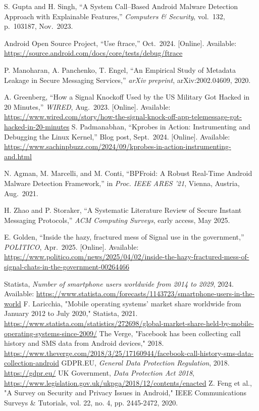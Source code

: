 \documentclass[a4paper,12pt]{report}
\begin{document}
\begin{thebibliography}{99}
S. Gupta and H. Singh, “A System Call–Based Android Malware Detection Approach with Explainable Features,” \emph{Computers \& Security}, vol.\ 132, p.~103187, Nov.\ 2023.

Android Open Source Project, “Use ftrace,” Oct.\ 2024.  [Online]. Available: \url{https://source.android.com/docs/core/tests/debug/ftrace}

P. Manoharan, A. Panchenko, T. Engel,
``An Empirical Study of Metadata Leakage in Secure Messaging Services,''
\emph{arXiv preprint}, arXiv:2002.04609, 2020.

A. Greenberg,
``How a Signal Knockoff Used by the US Military Got Hacked in 20 Minutes,''
\emph{WIRED}, Aug.\ 2023.
[Online]. Available: \url{https://www.wired.com/story/how-the-signal-knock-off-app-telemessage-got-hacked-in-20-minutes}
S. Padmanabhan, “Kprobes in Action: Instrumenting and Debugging the Linux Kernel,” Blog post, Sept.\ 2024.  [Online]. Available: \url{https://www.sachinpbuzz.com/2024/09/kprobes-in-action-instrumenting-and.html}

N. Agman, M. Marcelli, and M. Conti, “BPFroid: A Robust Real-Time Android Malware Detection Framework,” in \emph{Proc. IEEE ARES ’21}, Vienna, Austria, Aug.\ 2021.

H. Zhao and P. Storaker, “A Systematic Literature Review of Secure Instant Messaging Protocols,” \emph{ACM Computing Surveys}, early access, May 2025.

E. Golden, “Inside the hazy, fractured mess of Signal use in the government,” \emph{POLITICO}, Apr.\ 2025.  [Online]. Available: \url{https://www.politico.com/news/2025/04/02/inside-the-hazy-fractured-mess-of-signal-chats-in-the-government-00264466}

     Statista, \textit{Number of smartphone users worldwide from 2014 to 2029}, 2024. Available: \url{https://www.statista.com/forecasts/1143723/smartphone-users-in-the-world}
     F. Laricchia, "Mobile operating systems’ market share worldwide from January 2012 to July 2020," Statista, 2021. \url{https://www.statista.com/statistics/272698/global-market-share-held-by-mobile-operating-systems-since-2009/}
     The Verge, "Facebook has been collecting call history and SMS data from Android devices," 2018. \url{https://www.theverge.com/2018/3/25/17160944/facebook-call-history-sms-data-collection-android}
     GDPR.EU, \textit{General Data Protection Regulation}, 2018. \url{https://gdpr.eu/}
     UK Government, \textit{Data Protection Act 2018}, \url{https://www.legislation.gov.uk/ukpga/2018/12/contents/enacted}
     Z. Feng et al., "A Survey on Security and Privacy Issues in Android," IEEE Communications Surveys \& Tutorials, vol. 22, no. 4, pp. 2445-2472, 2020.


\end{thebibliography}
\end{document}
